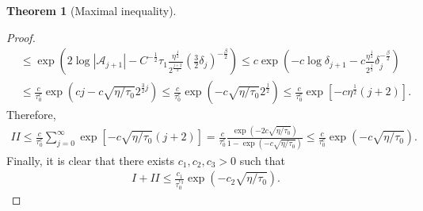\documentclass[11pt]{article}
\numberwithin{equation}{section}
\theoremstyle{plain}
\theoremstyle{definition}
\theoremstyle{definition}
\theoremstyle{assumption}
\theoremstyle{proposition}
\theoremstyle{proposition}
\theoremstyle{example}
\theoremstyle{lemma}
\theoremstyle{theorem}
\newtheorem{theorem}{Theorem}[section]
\theoremstyle{remark}
\begin{document}
\begin{theorem}[Maximal inequality]
\begin{proof}
\begin{align*}
&\leqslant \exp\left(2\log|\mathcal{A}_{j+1}| -  C^{-\frac{1}{2}}\tau_1\frac{\eta^{\frac{1}{2}}}{2^{\frac{j+2}{2}}} (\frac{3}{2}\delta_j)^{-\frac{\beta}{2}}\right) 
\leqslant c\exp\left(-c\log\delta_{j+1} - c \frac{\eta^{\frac{1}{2}}}{2^{\frac{j}{2}}} \delta_j^{-\frac{\beta}{2}}\right) \\
&\leqslant \frac{c}{\tau_0^c}\exp\left(cj - c \sqrt{\eta/\tau_0} 2^{\frac{3}{2}j} \right)
\leqslant \frac{c}{\tau_0^c}\exp\left(- c \sqrt{\eta/\tau_0} 2^{\frac{j}{2}}\right)
\leqslant \frac{c}{\tau_0^c}\exp\left[- c \eta^{\frac{1}{2}}(j+2)\right].
\end{align*}
Therefore,
\begin{align*}
II \leqslant \frac{c}{\tau_0^c}\sum_{j=0}^{\infty}\exp[- c \sqrt{\eta/\tau_0}(j+2)]
=\frac{c}{\tau_0^c}\frac{\exp(- 2c \sqrt{\eta/\tau_0})}{1 - \exp(- c \sqrt{\eta/\tau_0}) }
\leqslant \frac{c}{\tau_0^c}\exp(- c \sqrt{\eta/\tau_0}) .
\end{align*}
Finally, it is clear that there exists $c_1,c_2, c_3>0$ such that
\begin{align*}
I+II \leqslant \frac{c_1}{\tau_0^{c_3}}\exp(-c_2\sqrt{\eta/\tau_0}).
\end{align*}
\end{proof}
\end{theorem}
\end{document}
